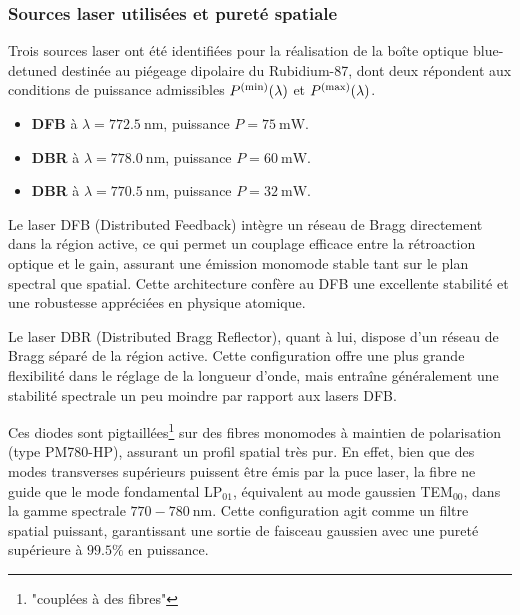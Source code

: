 \subsubsection*{Sources laser utilisées et pureté spatiale}

Trois sources laser ont été identifiées pour la réalisation de la boîte optique blue-detuned destinée au piégeage dipolaire du Rubidium-87, dont deux répondent aux conditions de puissance admissibles $P^{\rm (min)}(\lambda)$ et $P^{\rm (max)}(\lambda)$.

\begin{itemize}[label = $\bullet$]
    \item \textbf{DFB} à $\lambda = 772.5~\text{nm}$, puissance $P = 75~\text{mW}$.
    \item \textbf{DBR} à $\lambda = 778.0~\text{nm}$, puissance $P = 60~\text{mW}$. 
    \item \textbf{DBR} à $\lambda = 770.5~\text{nm}$, puissance $P = 32~\text{mW}$.
\end{itemize}

\medskip

Le laser \gls{DFB} (Distributed Feedback) intègre un réseau de Bragg directement dans la région active, ce qui permet un couplage efficace entre la rétroaction optique et le gain, assurant une émission monomode stable tant sur le plan spectral que spatial. Cette architecture confère au DFB une excellente stabilité et une robustesse appréciées en physique atomique.

Le laser \gls{DBR} (Distributed Bragg Reflector), quant à lui, dispose d’un réseau de Bragg séparé de la région active. Cette configuration offre une plus grande flexibilité dans le réglage de la longueur d’onde, mais entraîne généralement une stabilité spectrale un peu moindre par rapport aux lasers DFB.

\medskip


Ces diodes sont pigtaillées\footnote{"couplées à des fibres"} sur des fibres monomodes à maintien de polarisation (type PM780-HP), assurant un profil spatial très pur. En effet, bien que des modes transverses supérieurs puissent être émis par la puce laser, la fibre ne guide que le mode fondamental LP$_{01}$, équivalent au mode gaussien TEM$_{00}$, dans la gamme spectrale $770{-}780~\text{nm}$. Cette configuration agit comme un filtre spatial puissant, garantissant une sortie de faisceau gaussien avec une pureté supérieure à $99.5\%$ en puissance.

\medskip

